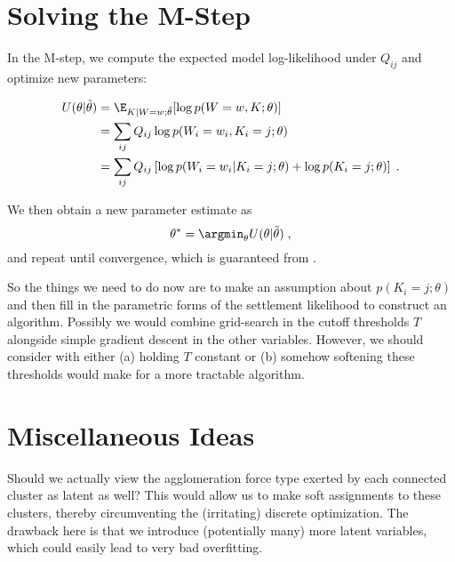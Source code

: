 \documentclass[english]{scrartcl}
\begin{document}
\section{Solving the M-Step}
	
	In the M-step, we compute the expected model log-likelihood under $Q_{ij}$ and optimize new parameters: 

	\begin{align*}
		U(\theta | \tilde{\theta}) &= \E_{K|W = w; \tilde{\theta}}[\log p(W = w, K; \theta)] \\ 
		&= \sum_{ij} Q_{ij} \log p(W_i = w_i, K_i = j; \theta) \\ 
		&= \sum_{ij} Q_{ij} \left[\log p(W_i = w_i | K_i = j; \theta) + \log p(K_i = j; \theta) \right] \;.
	\end{align*}

	We then obtain a new parameter estimate as 
	\begin{equation*}
		\theta^* = \argmin_{\theta} U(\theta |\tilde{\theta})\;,
	\end{equation*}
	and repeat until convergence, which is guaranteed from \cite{Dempster1977}. 

	So the things we need to do now are to make an assumption about $p(K_i = j; \theta)$ and then fill in the parametric forms of the settlement likelihood to construct an algorithm. Possibly we would combine grid-search in the cutoff thresholds $T$ alongside simple gradient descent in the other variables. However, we should consider with either (a) holding $T$ constant or (b) somehow softening these thresholds would make for a more tractable algorithm. 
	
\section{Miscellaneous Ideas}
	Should we actually view the agglomeration force type exerted by each connected cluster as latent as well? This would allow us to make soft assignments to these clusters, thereby circumventing the (irritating) discrete optimization. The drawback here is that we introduce (potentially many) more latent variables, which could easily lead to very bad overfitting. 



{}

\end{document}
